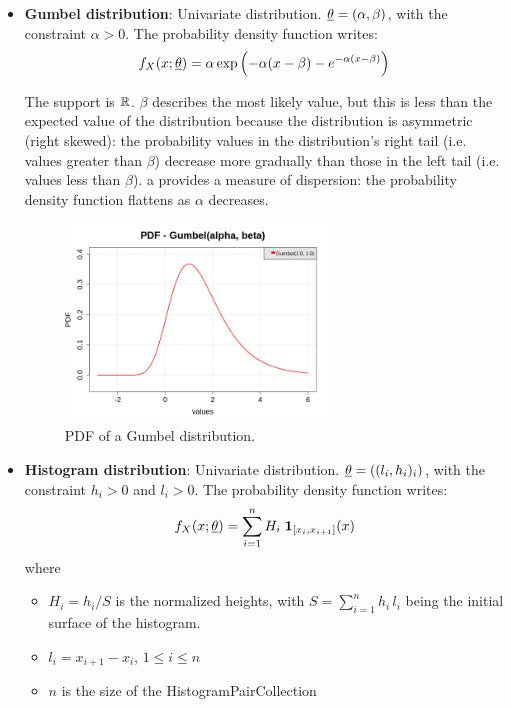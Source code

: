{\begin{itemize}
\item {\bf Gumbel distribution}: Univariate distribution. ${\underline{\theta}} = \left( \alpha,\beta \right)$, with the constraint $\alpha>0$. The probability density function writes:
\begin{equation}
f_X(x;{\underline{\theta}}) = \alpha \exp \left( -\alpha(x-\beta) - e^{-\alpha(x-\beta)} \right)
\end{equation}

The support is ${\mathbb R}$. $\beta$ describes the most likely value, but this is less than the expected value of the distribution because the distribution is asymmetric (right skewed): the probability values in the distribution's right tail (i.e. values greater than $\beta$) decrease more gradually than those in the left tail (i.e. values less than $\beta$). a provides a measure of dispersion: the probability density function flattens as $\alpha$ decreases.

\begin{figure}[H]
\begin{center}
\includegraphics[width=7cm]{Figures/pdf_Gumbel.png}
\caption{PDF of a Gumbel distribution.}
\end{center}
\end{figure}


\item {\bf Histogram distribution}: Univariate distribution. ${\underline{\theta}} = \left( (l_i, h_i)_i \right)$, with the constraint $h_i>0$ and $l_i>0$. The probability density function writes:
\begin{equation}
f_X(x;{\underline{\theta}}) = \sum_{i=1}^{n}H_i\;\boldsymbol{1}_{[x_i,x_{i+1}]}(x)
\end{equation}
where
\begin{itemize}
\item $H_i=h_i/S$ is the normalized heights, with $S=\sum_{i=1}^nh_i\,l_i$ being the initial surface of the histogram.
\item $l_i = x_{i+1} - x_i$, $1\leq i \leq n$
\item $n$ is the size of the HistogramPairCollection
\end{itemize}




\end{itemize}}
